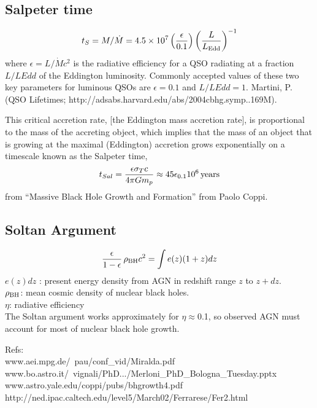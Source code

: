 \documentclass[11pt]{article}
\begin{document}
\subsection{Salpeter time}
\begin{equation}
  t_{S} = M/\dot{M} = 4.5 \times10^{7} \left( \frac{\epsilon}{0.1}\right ) \left( \frac{L}{L_{\rm Edd}}\right )^{-1}
\end{equation}
where $\epsilon = L/\dot{M} c^{2}$ is the radiative efficiency for a QSO radiating at a fraction $L/LEdd$ of the Eddington luminosity. Commonly accepted values of these two key parameters for luminous QSOs are $\epsilon= 0.1$ and $L/LEdd = 1$. 
Martini, P. (QSO Lifetimes; http://adsabs.harvard.edu/abs/2004cbhg.symp..169M). 

This critical accretion rate, [the Eddington mass accretion rate], is proportional to the mass of the accreting object, which implies that the mass of an object that is growing at the maximal (Eddington) accretion grows exponentially on a timescale known as the Salpeter time,
\begin{equation}
  t_{Sal} = \frac{\epsilon \sigma_{T} c}{4\pi G m_{p}} \approx 45 \epsilon_{0.1} 10^6 \, {\rm years}
\end{equation}
from ``Massive Black Hole Growth and Formation'' from Paolo Coppi. 


\subsection{Soltan Argument}
\begin{equation}
  \frac{\epsilon}{1-\epsilon} \, \rho_{\rm BH} c^{2} = \int e(z) (1+z) dz
\end{equation}
$e(z) dz$ : present energy density from AGN in redshift range $z$ to $z+dz$.\\
$\rho_{\rm BH}$: mean cosmic density of nuclear black holes.\\
$\eta$: radiative efficiency\\
The Soltan argument works approximately for $\eta\approx$0.1, 
so observed AGN must account for most of nuclear black hole growth.

Refs:\\
www.aei.mpg.de/~pau/conf\_vid/Miralda.pdf\\
www.bo.astro.it/~vignali/PhD.../Merloni\_PhD\_Bologna\_Tuesday.pptx
www.astro.yale.edu/coppi/pubs/bhgrowth4.pdf
http://ned.ipac.caltech.edu/level5/March02/Ferrarese/Fer2.html
\end{document}
